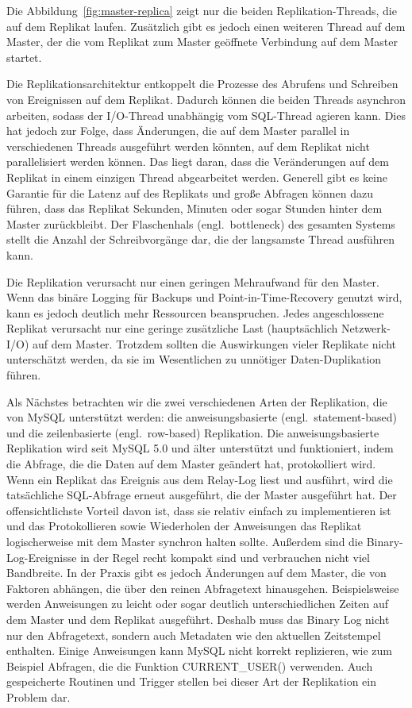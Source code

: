 Die Abbildung~\ref{fig:master-replica} zeigt nur die beiden Replikation-Threads, die auf dem Replikat laufen.
Zusätzlich gibt es jedoch einen weiteren Thread auf dem Master, der die vom Replikat zum Master geöffnete Verbindung auf dem Master startet.

Die Replikationsarchitektur entkoppelt die Prozesse des Abrufens und Schreiben von Ereignissen auf dem Replikat.
Dadurch können die beiden Threads asynchron arbeiten, sodass der I/O-Thread unabhängig vom SQL-Thread agieren kann.
Dies hat jedoch zur Folge, dass Änderungen, die auf dem Master parallel in verschiedenen Threads ausgeführt werden könnten, auf dem Replikat nicht parallelisiert werden können.
Das liegt daran, dass die Veränderungen auf dem Replikat in einem einzigen Thread abgearbeitet werden.
Generell gibt es keine Garantie für die Latenz auf des Replikats und große Abfragen können dazu führen, dass das Replikat Sekunden, Minuten oder sogar Stunden hinter dem Master zurückbleibt.
Der Flaschenhals (engl.\ bottleneck) des gesamten Systems stellt die Anzahl der Schreibvorgänge dar, die der langsamste Thread ausführen kann.

Die Replikation verursacht nur einen geringen Mehraufwand für den Master.
Wenn das binäre Logging für Backups und Point-in-Time-Recovery genutzt wird, kann es jedoch deutlich mehr Ressourcen beanspruchen.
Jedes angeschlossene Replikat verursacht nur eine geringe zusätzliche Last (hauptsächlich Netzwerk-I/O) auf dem Master.
Trotzdem sollten die Auswirkungen vieler Replikate nicht unterschätzt werden, da sie im Wesentlichen zu unnötiger Daten-Duplikation führen.

Als Nächstes betrachten wir die zwei verschiedenen Arten der Replikation, die von MySQL unterstützt werden: die anweisungsbasierte (engl.\ statement-based) und die zeilenbasierte (engl.\ row-based) Replikation.
Die anweisungsbasierte Replikation wird seit MySQL 5.0 und älter unterstützt und funktioniert, indem die Abfrage, die die Daten auf dem Master geändert hat, protokolliert wird.
Wenn ein Replikat das Ereignis aus dem Relay-Log liest und ausführt, wird die tatsächliche SQL-Abfrage erneut ausgeführt, die der Master ausgeführt hat.
Der offensichtlichste Vorteil davon ist, dass sie relativ einfach zu implementieren ist und das Protokollieren sowie Wiederholen der Anweisungen das Replikat logischerweise mit dem Master synchron halten sollte.
Außerdem sind die Binary-Log-Ereignisse in der Regel recht kompakt sind und verbrauchen nicht viel Bandbreite.
In der Praxis gibt es jedoch Änderungen auf dem Master, die von Faktoren abhängen, die über den reinen Abfragetext hinausgehen.
Beispielsweise werden Anweisungen zu leicht oder sogar deutlich unterschiedlichen Zeiten auf dem Master und dem Replikat ausgeführt.
Deshalb muss das Binary Log nicht nur den Abfragetext, sondern auch Metadaten wie den aktuellen Zeitstempel enthalten.
Einige Anweisungen kann MySQL nicht korrekt replizieren, wie zum Beispiel Abfragen, die die Funktion CURRENT\_USER() verwenden.
Auch gespeicherte Routinen und Trigger stellen bei dieser Art der Replikation ein Problem dar.

